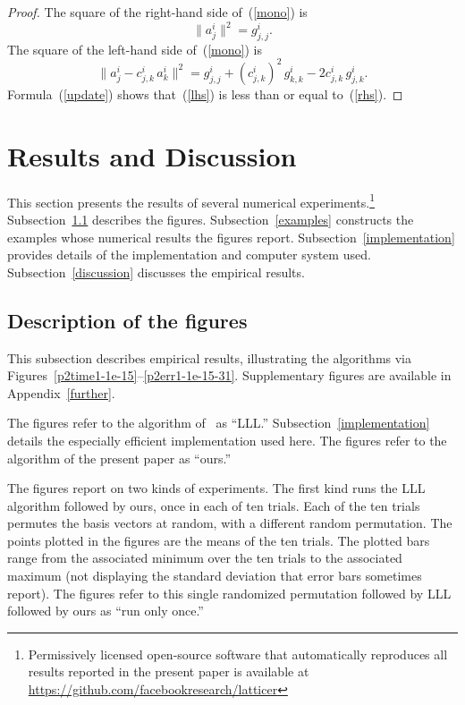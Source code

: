 \documentclass{article}
\begin{document}
\begin{proof}
The square of the right-hand side of~(\ref{mono}) is
%
\begin{equation}
\label{rhs}
\| a^i_j \|^2 = g^i_{j,j}.
\end{equation}
%
The square of the left-hand side of~(\ref{mono}) is
%
\begin{equation}
\label{lhs}
\| a^i_j - c^i_{j,k} \, a^i_k \|^2
= g^i_{j,j} + (c^i_{j,k})^2 \, g^i_{k,k} - 2 c^i_{j,k} \, g^i_{j,k}.
\end{equation}
%
Formula~(\ref{update}) shows that~(\ref{lhs})
is less than or equal to~(\ref{rhs}).
\end{proof}



\section{Results and Discussion}
\label{results}

This section presents the results
of several numerical experiments.\footnote{Permissively licensed open-source
software that automatically reproduces all results reported
in the present paper is available at
\url{https://github.com/facebookresearch/latticer}}
Subsection~\ref{figures} describes the figures.
Subsection~\ref{examples} constructs the examples whose numerical results
the figures report.
Subsection~\ref{implementation} provides details of the implementation
and computer system used.
Subsection~\ref{discussion} discusses the empirical results.

\subsection{Description of the figures}
\label{figures}

This subsection describes empirical results, illustrating the algorithms
via Figures~\ref{p2time1-1e-15}--\ref{p2err1-1e-15-31}.
Supplementary figures are available in Appendix~\ref{further}.

The figures refer to the algorithm of~\cite{lenstra-lenstra-lovasz} as ``LLL.''
Subsection~\ref{implementation} details the especially efficient implementation
used here. The figures refer to the algorithm of the present paper as ``ours.''

The figures report on two kinds of experiments.
The first kind runs the LLL algorithm followed by ours,
once in each of ten trials. Each of the ten trials permutes the basis vectors
at random, with a different random permutation. The points plotted
in the figures are the means of the ten trials. The plotted bars range
from the associated minimum over the ten trials to the associated maximum
(not displaying the standard deviation that error bars sometimes report).
The figures refer to this single randomized permutation followed by LLL
followed by ours as ``run only once.''
\end{document}
